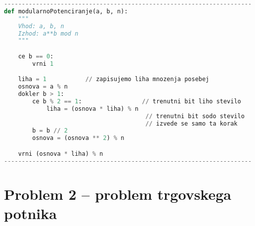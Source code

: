\documentclass[a4paper,11pt]{article}
\begin{document}
\begin{lstlisting}[language = Python]
----------------------------------------------------------------------
def modularnoPotenciranje(a, b, n):
    """
    Vhod: a, b, n
    Izhod: a**b mod n
    """

    ce b == 0:
        vrni 1

    liha = 1           // zapisujemo liha mnozenja posebej
    osnova = a % n      
    dokler b > 1:
        ce b % 2 == 1:                 // trenutni bit liho stevilo
            liha = (osnova * liha) % n                         
                                        // trenutni bit sodo stevilo 
                                        // izvede se samo ta korak
        b = b // 2             
        osnova = (osnova ** 2) % n

    vrni (osnova * liha) % n
----------------------------------------------------------------------

\end{lstlisting}


\section*{Problem 2 -- problem trgovskega potnika}
\end{document}
